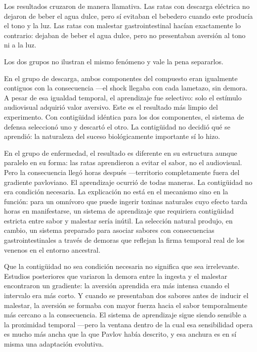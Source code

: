 \documentclass[
  letterpaper,
  DIV=11,
  numbers=noendperiod]{scrreprt}
\begin{document}
\begin{tcolorbox}[enhanced jigsaw, arc=.35mm, bottomrule=.15mm, breakable, colback=white, colframe=quarto-callout-note-color-frame, left=2mm, leftrule=.75mm, opacityback=0, rightrule=.15mm, toprule=.15mm]
Los resultados cruzaron de manera llamativa. Las ratas con descarga
eléctrica no dejaron de beber el agua dulce, pero sí evitaban el
bebedero cuando este producía el tono y la luz. Las ratas con malestar
gastrointestinal hacían exactamente lo contrario: dejaban de beber el
agua dulce, pero no presentaban aversión al tono ni a la luz.

Los dos grupos no ilustran el mismo fenómeno y vale la pena separarlos.

En el grupo de descarga, ambos componentes del compuesto eran igualmente
contiguos con la consecuencia ---el shock llegaba con cada lametazo, sin
demora. A pesar de esa igualdad temporal, el aprendizaje fue selectivo:
solo el estímulo audiovisual adquirió valor aversivo. Este es el
resultado más limpio del experimento. Con contigüidad idéntica para los
dos componentes, el sistema de defensa seleccionó uno y descartó el
otro. La contigüidad no decidió qué se aprendió: la naturaleza del
suceso biológicamente importante sí lo hizo.

En el grupo de enfermedad, el resultado es diferente en su estructura
aunque paralelo en su forma: las ratas aprendieron a evitar el sabor, no
el audiovisual. Pero la consecuencia llegó horas después ---territorio
completamente fuera del gradiente pavloviano. El aprendizaje ocurrió de
todas maneras. La contigüidad no era condición necesaria. La explicación
no está en el mecanismo sino en la función: para un omnívoro que puede
ingerir toxinas naturales cuyo efecto tarda horas en manifestarse, un
sistema de aprendizaje que requiriera contigüidad estricta entre sabor y
malestar sería inútil. La selección natural produjo, en cambio, un
sistema preparado para asociar sabores con consecuencias
gastrointestinales a través de demoras que reflejan la firma temporal
real de los venenos en el entorno ancestral.

Que la contigüidad no sea condición necesaria no significa que sea
irrelevante. Estudios posteriores que variaron la demora entre la
ingesta y el malestar encontraron un gradiente: la aversión aprendida
era más intensa cuando el intervalo era más corto. Y cuando se
presentaban dos sabores antes de inducir el malestar, la aversión se
formaba con mayor fuerza hacia el sabor temporalmente más cercano a la
consecuencia. El sistema de aprendizaje sigue siendo sensible a la
proximidad temporal ---pero la ventana dentro de la cual esa
sensibilidad opera es mucho más ancha que la que Pavlov había descrito,
y esa anchura es en sí misma una adaptación evolutiva.


\end{tcolorbox}
\end{document}
